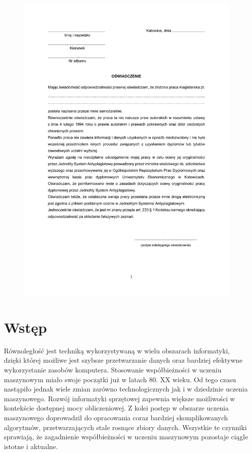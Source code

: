 \documentclass[12pt]{article}
\begin{document}
\begin{figure}[H]
    \centering
	\includegraphics[width=\paperwidth,height=\paperheight,keepaspectratio]{plagiat.pdf}
\end{figure}
\newpage

\restoregeometry

\tableofcontents
\newpage

\cleardoublepage
{}
{}
\section*{Wstęp}
Równoległość jest techniką wykorzystywaną w wielu obszarach informatyki, dzięki której 
możliwe jest szybsze przetwarzanie danych oraz bardziej efektywne wykorzystanie zasobów komputera.
Stosowanie współbieżności w uczeniu maszynowym miało swoje początki już w latach 80. XX wieku.
Od tego czasu nastąpiło jednak wiele zmian zarówno technologicznych jak i w dziedzinie uczenia maszynowego.
Rozwój informatyki sprzętowej zapewnia większe możliwości w kontekście dostępnej mocy obliczeniowej.
Z kolei postęp w obszarze uczenia maszynowego doprowadził do opracowania coraz bardziej skomplikowanych algorytmów, 
przetwarzających stale rosnące zbiory danych. Wszystkie te czynniki sprawiają, że zagadnienie współbieżności w uczeniu 
maszynowym pozostaje ciągle istotne i aktualne.
\end{document}
